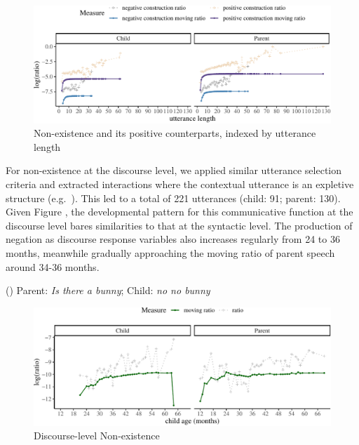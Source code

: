 \documentclass[
  english,
  man,floatsintext]{apa6}
\begin{document}
\begin{figure}[H]

{\centering \includegraphics{neg_construction_article_files/figure-latex/existenceul-1} 

}

\caption{Non-existence and its positive counterparts, indexed by utterance length}\label{fig:existenceul}
\end{figure}

For non-existence at the discourse level, we applied similar utterance selection criteria and extracted interactions where the contextual utterance is an expletive structure (e.g.~). This led to a total of 221 utterances (child: 91; parent: 130).
Given Figure , the developmental pattern for this communicative function at the discourse level bares similarities to that at the syntactic level. The production of negation as discourse response variables also increases regularly from 24 to 36 months, meanwhile gradually approaching the moving ratio of parent speech around 34-36 months.

() Parent: \emph{Is there a bunny}; Child: \emph{no no bunny}

\begin{figure}[H]

{\centering \includegraphics{neg_construction_article_files/figure-latex/existencediscourse-1} 

}

\caption{Discourse-level Non-existence}\label{fig:existencediscourse}
\end{figure}
\end{document}
